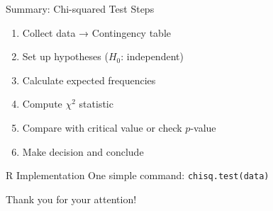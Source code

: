 \documentclass{beamer}					%
\begin{document}
\begin{frame}{Summary: Chi-squared Test Steps}
    \begin{enumerate}
        \item Collect data → Contingency table
        \item Set up hypotheses ($H_0$: independent)
        \item Calculate expected frequencies
        \item Compute $\chi^2$ statistic
        \item Compare with critical value or check $p$-value
        \item Make decision and conclude
    \end{enumerate}
    
    \vspace{1em}
    
    \begin{block}{R Implementation}
    One simple command: \texttt{chisq.test(data)}
    \end{block}
\end{frame}

\begin{frame}{}    
    \begin{center}
    \Large Thank you for your attention!
    \end{center}
\end{frame}
\end{document}
